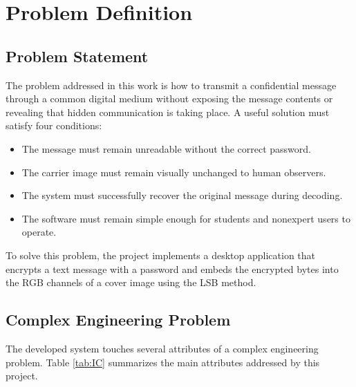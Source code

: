 \documentclass[12pt]{report}
\begin{document}
\section{Problem Definition}

\subsection{Problem Statement}
The problem addressed in this work is how to transmit a confidential message through a common digital medium without exposing the message contents or revealing that hidden communication is taking place. A useful solution must satisfy four conditions:
\begin{itemize}
    \item The message must remain unreadable without the correct password.
    \item The carrier image must remain visually unchanged to human observers.
    \item The system must successfully recover the original message during decoding.
    \item The software must remain simple enough for students and nonexpert users to operate.
\end{itemize}

To solve this problem, the project implements a desktop application that encrypts a text message with a password and embeds the encrypted bytes into the RGB channels of a cover image using the LSB method.

\subsection{Complex Engineering Problem}
The developed system touches several attributes of a complex engineering problem. Table \ref{tab:IC} summarizes the main attributes addressed by this project.
\end{document}
